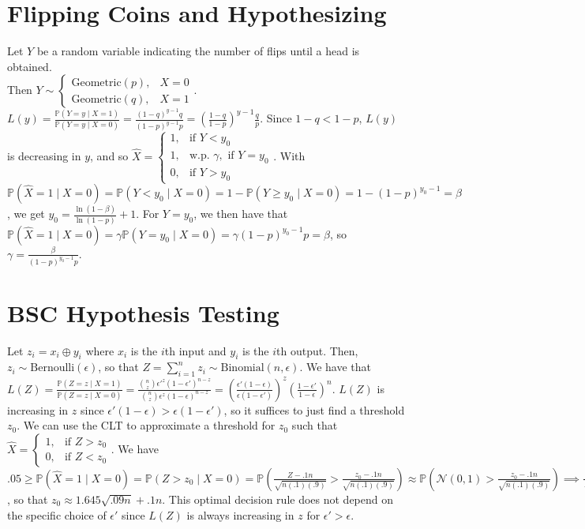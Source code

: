 \documentclass[11pt]{article}
\begin{document}
\section{Flipping Coins and Hypothesizing}
Let $Y$ be a random variable indicating the number of flips until a head is
obtained. \\
Then $Y \sim
\begin{cases}
    \text{Geometric}(p), & X = 0 \\
    \text{Geometric}(q), & X = 1
\end{cases}
$. $L(y) = \frac{\mathbb{P}(Y = y \mid X = 1)}{\mathbb{P}(Y = y \mid X = 0)} =
\frac{(1 - q)^{y - 1} q}{(1 - p)^{y - 1} p} = \left(\frac{1 - q}{1 -
p}\right)^{y - 1} \frac{q}{p}$. Since $1 - q < 1 - p$, $L(y)$ is decreasing in
$y$, and so $\hat{X} =
\begin{cases}
    1, & \text{if } Y < y_{0} \\
    1, & \text{w.p. } \gamma, \text{ if } Y = y_{0} \\
    0, & \text{if } Y > y_{0}
\end{cases}$. With $\mathbb{P}(\hat{X} = 1 \mid X = 0) = \mathbb{P}(Y <
y_{0} \mid X = 0) = 1 - \mathbb{P}(Y \geq y_{0} \mid X = 0) = 1 - (1 -
p)^{y_{0} - 1} = \beta$, we get
$y_{0} = \frac{\ln{(1 - \beta)}}{\ln{(1 - p)}} + 1$. For $Y = y_{0}$, we then
have that $\mathbb{P}(\hat{X} = 1 \mid X = 0) = \gamma \mathbb{P}(Y = y_{0}
\mid X = 0) = \gamma (1 - p)^{y_{0} - 1} p = \beta$, so $\gamma =
\frac{\beta}{(1 - p)^{y_{0} - 1} p}$.

\section{BSC Hypothesis Testing}
Let $z_{i} = x_{i} \oplus y_{i}$ where $x_{i}$ is the $i$th input and $y_{i}$
is the $i$th output. Then, $z_{i} \sim \text{Bernoulli}(\epsilon)$, so that $Z
= \sum_{i = 1}^{n} z_{i} \sim \text{Binomial}(n, \epsilon)$. We have that
$L(Z) = \frac{\mathbb{P}(Z = z \mid X = 1)}{\mathbb{P}(Z = z \mid X = 0)} =
\frac{\binom{n}{z} \epsilon'^{z} (1 - \epsilon')^{n - z}}{\binom{n}{z}
\epsilon^{z} (1 - \epsilon)^{n - z}} =
\left(\frac{\epsilon' (1 - \epsilon)}{\epsilon (1 - \epsilon')}\right)^{z} \left(\frac{1 -
\epsilon'}{1 - \epsilon}\right)^{n}$. $L(Z)$ is increasing in $z$ since
$\epsilon' (1 - \epsilon) > \epsilon (1 - \epsilon')$, so it suffices to
just find a threshold $z_{0}$. We can use the CLT to
approximate a threshold for $z_{0}$ such that $\hat{X} =
\begin{cases}
    1, & \text{if } Z > z_{0} \\
    0, & \text{if } Z < z_{0}
\end{cases}$. We have $.05 \geq \mathbb{P}(\hat{X} = 1 \mid X = 0) = \mathbb{P}(Z >
z_{0} \mid X = 0) = \mathbb{P}\left(\frac{Z - .1n}{\sqrt{n(.1)(.9)}} >
\frac{z_{0} - .1n}{\sqrt{n(.1)(.9)}}\right) \approx \mathbb{P}\left(\mathcal{N}(0,
1) > \frac{z_{0} - .1n}{\sqrt{n(.1)(.9)}}\right) \implies \frac{z_{0} -
.1n}{\sqrt{n(.1)(.9)}} \approx 1.645$, so that $z_{0} \approx 1.645 \sqrt{.09n}
+ .1n$. This optimal decision rule does not depend on the specific choice of
$\epsilon'$ since $L(Z)$ is always increasing in $z$ for $\epsilon' > \epsilon$.
\end{document}
